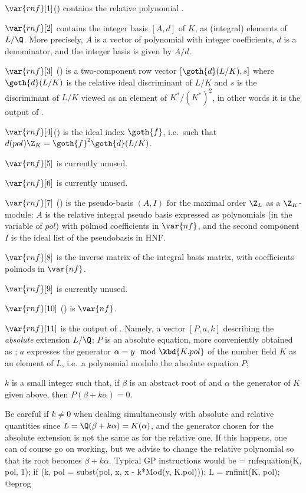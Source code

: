 $\var{rnf}[1]$() contains the relative polynomial .

$\var{rnf}[2]$ contains the integer basis $[A,d]$ of $K$, as
(integral) elements of $L/\Q$. More precisely, $A$ is a vector of
polynomial with integer coefficients, $d$ is a denominator, and the integer
basis is given by $A/d$.

$\var{rnf}[3]$ () is a two-component row vector
$[\goth{d}(L/K),s]$ where $\goth{d}(L/K)$ is the relative ideal discriminant
of $L/K$ and $s$ is the discriminant of $L/K$ viewed as an element of
$K^*/(K^*)^2$, in other words it is the output of .

$\var{rnf}[4]$() is the ideal index $\goth{f}$, i.e.~such
that $d(pol)\Z_K=\goth{f}^2\goth{d}(L/K)$.

$\var{rnf}[5]$ is currently unused.

$\var{rnf}[6]$ is currently unused.

$\var{rnf}[7]$ () is the pseudo-basis $(A,I)$ for the maximal
order $\Z_L$ as a $\Z_K$-module: $A$ is the relative integral pseudo basis
expressed as polynomials (in the variable of $pol$) with polmod coefficients
in $\var{nf}$, and the second component $I$ is the ideal list of the
pseudobasis in HNF.

$\var{rnf}[8]$ is the inverse matrix of the integral basis matrix, with
coefficients polmods in $\var{nf}$.

$\var{rnf}[9]$ is currently unused.

$\var{rnf}[10]$ () is $\var{nf}$.

$\var{rnf}[11]$ is the output of . Namely, a
vector $[P, a, k]$ describing the \emph{absolute} extension
$L/\Q$: $P$ is an absolute equation, more conveniently obtained
as ; $a$ expresses the generator $\alpha = y \mod \kbd{K.pol}$
of the number field $K$ as an element of $L$, i.e.~a polynomial modulo the
absolute equation $P$;

$k$ is a small integer such that, if $\beta$ is an abstract root of 
and $\alpha$ the generator of $K$ given above, then $P(\beta + k\alpha) = 0$.

 Be careful if $k\neq0$ when dealing simultaneously with
absolute and relative quantities since $L = \Q(\beta + k\alpha) =
K(\alpha)$, and the generator chosen for the absolute extension is not the
same as for the relative one. If this happens, one can of course go on
working, but we advise to change the relative polynomial so that its root
becomes $\beta + k \alpha$. Typical GP instructions would be
\bprog
  [P,a,k] = rnfequation(K, pol, 1);
  if (k, pol = subst(pol, x, x - k*Mod(y, K.pol)));
  L = rnfinit(K, pol);
@eprog

